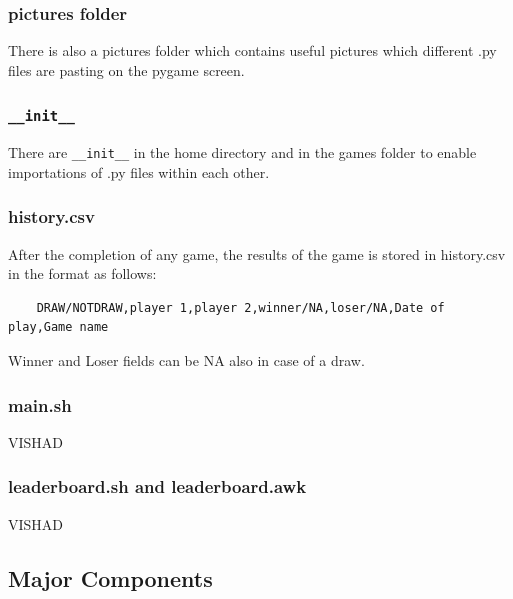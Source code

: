 \documentclass[12pt, a4paper]{article}
\begin{document}
\subsubsection*{pictures folder}
There is also a pictures folder which contains useful pictures which different .py files are pasting on the pygame screen.

\subsubsection*{\texttt{\_\_init\_\_}}
There are \texttt{\_\_init\_\_} in the home directory and in the games folder to enable importations of .py files within each other.

\subsubsection*{history.csv}
After the completion of any game, the results of the game is stored in history.csv in the format as follows:
\begin{lstlisting}
    DRAW/NOTDRAW,player 1,player 2,winner/NA,loser/NA,Date of play,Game name
\end{lstlisting}
Winner and Loser fields can be NA also in case of a draw.

\subsubsection*{main.sh}
VISHAD

\subsubsection*{leaderboard.sh and leaderboard.awk}
VISHAD



\subsection{Major Components}
\end{document}
